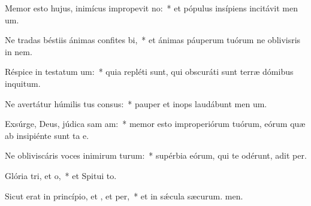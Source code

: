 \item Memor esto hujus, inimícus impropevit no:~* et pópulus insípiens incitávit men um.
\item Ne tradas béstiis ánimas confites bi,~* et ánimas páuperum tuórum ne oblivisris in nem.
\item Réspice in testatum um:~* quia repléti sunt, qui obscuráti sunt terræ dómibus inquitum.
\item Ne avertátur húmilis tus consus:~* pauper et inops laudábunt men um.
\item Exsúrge, Deus, júdica sam am:~* memor esto improperiórum tuórum, eórum quæ ab insipiénte sunt ta e.
\item Ne obliviscáris voces inimirum turum:~* supérbia eórum, qui te odérunt, adit per.
\item Glória tri, et o,~* et Spitui to.
\item Sicut erat in princípio, et , et per,~* et in sǽcula sæcurum. men.
